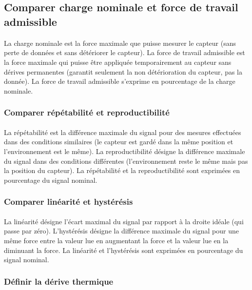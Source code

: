 \documentclass{article}
\begin{document}
\subsection{Comparer charge nominale et force de travail admissible}
\paragraph{}
La charge nominale est la force maximale que puisse mesurer le capteur (sans perte de données et sans détériorer le capteur). La force de travail admissible est la force maximale qui puisse être appliquée temporairement au capteur sans dérives permanentes (garantit seulement la non détérioration du capteur, pas la donnée). La force de travail admissible s'exprime en pourcentage de la charge nominale.

\subsubsection{Comparer répétabilité et reproductibilité}
\paragraph{}
La répétabilité est la différence maximale du signal pour des mesures effectuées dans des conditions similaires (le capteur est gardé dans la même position et l'environnement est le même). La reproductibilité désigne la différence maximale du signal dans des conditions différentes (l'environnement reste le même mais pas la position du capteur). La répétabilité et la reproductibilité sont exprimées en pourcentage du signal nominal.

\subsubsection{Comparer linéarité et hystérésis}
\paragraph{}
La linéarité désigne l'écart maximal du signal par rapport à la droite idéale (qui passe par zéro). L'hystérésis désigne la différence maximale du signal pour une même force entre la valeur lue en augmentant la force et la valeur lue en la diminuant la force. La linéarité et l'hystérésis sont exprimées en pourcentage du signal nominal.

\subsubsection{Définir la dérive thermique}
\end{document}
